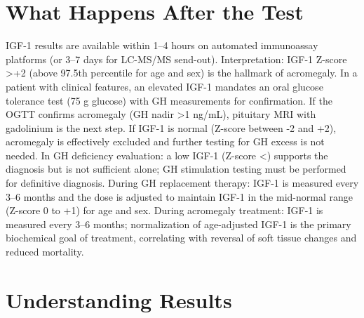 \section*{What Happens After the Test}
IGF-1 results are available within 1--4 hours on automated immunoassay platforms (or 3--7 days for LC-MS/MS send-out). Interpretation: IGF-1 Z-score >+2 (above 97.5th percentile for age and sex) is the hallmark of acromegaly. In a patient with clinical features, an elevated IGF-1 mandates an oral glucose tolerance test (75 g glucose) with GH measurements for confirmation. If the OGTT confirms acromegaly (GH nadir >1 ng/mL), pituitary MRI with gadolinium is the next step. If IGF-1 is normal (Z-score between -2 and +2), acromegaly is effectively excluded and further testing for GH excess is not needed. In GH deficiency evaluation: a low IGF-1 (Z-score <) supports the diagnosis but is not sufficient alone; GH stimulation testing must be performed for definitive diagnosis. During GH replacement therapy: IGF-1 is measured every 3--6 months and the dose is adjusted to maintain IGF-1 in the mid-normal range (Z-score 0 to +1) for age and sex. During acromegaly treatment: IGF-1 is measured every 3--6 months; normalization of age-adjusted IGF-1 is the primary biochemical goal of treatment, correlating with reversal of soft tissue changes and reduced mortality.

\section*{Understanding Results}

